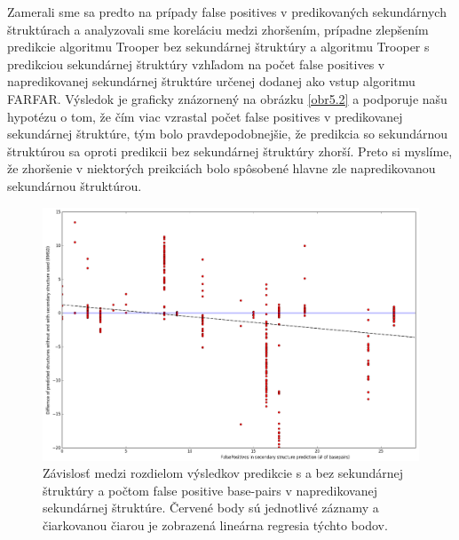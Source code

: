 \indent Zamerali sme sa predto na prípady false positives v predikovaných sekundárnych štruktúrach a analyzovali sme koreláciu medzi zhoršením, prípadne zlepšením predikcie algoritmu Trooper bez sekundárnej štruktúry a algoritmu Trooper s predikciou sekundárnej štruktúry vzhľadom na počet false positives v napredikovanej sekundárnej štruktúre určenej dodanej ako vstup algoritmu FARFAR. Výsledok je graficky znázornený na obrázku \ref{obr5.2} a podporuje našu hypotézu o tom, že čím viac vzrastal počet false positives v predikovanej sekundárnej štruktúre, tým bolo pravdepodobnejšie, že predikcia so sekundárnou štruktúrou sa oproti predikcii bez sekundárnej štruktúry zhorší. Preto si myslíme, že zhoršenie v niektorých preikciách bolo spôsobené hlavne zle napredikovanou sekundárnou štruktúrou.
\begin{figure}%
\includegraphics[width=\textwidth]{../img/corelation}
\caption{Závislosť medzi rozdielom výsledkov predikcie s a bez sekundárnej štruktúry a počtom false positive base-pairs v napredikovanej sekundárnej štruktúre. Červené body sú jednotlivé záznamy a čiarkovanou čiarou je zobrazená lineárna regresia týchto bodov.}
\label{obr5.1}
\end{figure}